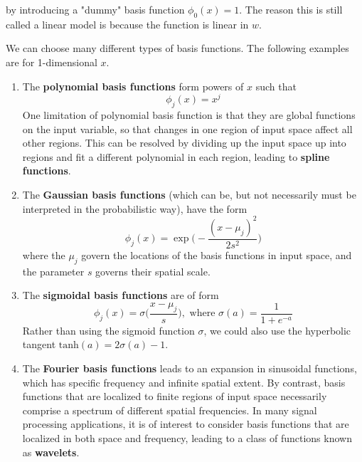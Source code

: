 \documentclass{article}
\begin{document}
    by introducing a "dummy" basis function $\phi_0 (x) = 1$. The reason this is still called a linear model is because the function is linear in $w$.

    We can choose many different types of basis functions. The following examples are for 1-dimensional $x$.
    \begin{enumerate}
      \item The \textbf{polynomial basis functions} form powers of $x$ such that
      \begin{equation}
        \phi_j (x) = x^j
      \end{equation}
      One limitation of polynomial basis function is that they are global functions on the input variable, so that changes in one region of input space affect all other regions. This can be resolved by dividing up the input space up into regions and fit a different polynomial in each region, leading to \textbf{spline functions}.

      \item The \textbf{Gaussian basis functions} (which can be, but not necessarily must be interpreted in the probabilistic way), have the form
      \begin{equation}
        \phi_j (x) = \exp \bigg(-\frac{(x - \mu_j)^2}{2 s^2}\bigg)
      \end{equation}
      where the $\mu_j$ govern the locations of the basis functions in input space, and the parameter $s$ governs their spatial scale.

      \item The \textbf{sigmoidal basis functions} are of form
      \begin{equation}
        \phi_j (x) = \sigma \bigg( \frac{x - \mu_j}{s} \bigg), \text{ where } \sigma(a) = \frac{1}{1 + e^{-a}}
      \end{equation}
      Rather than using the sigmoid function $\sigma$, we could also use the hyperbolic tangent $\text{tanh}(a) = 2\sigma(a) - 1$.

      \item The \textbf{Fourier basis functions} leads to an expansion in sinusoidal functions, which has specific frequency and infinite spatial extent. By contrast, basis functions that are localized to finite regions of input space necessarily comprise a spectrum of different spatial frequencies. In many signal processing applications, it is of interest to consider basis functions that are localized in both space and frequency, leading to a class of functions known as \textbf{wavelets}.
    \end{enumerate}
\end{document}
